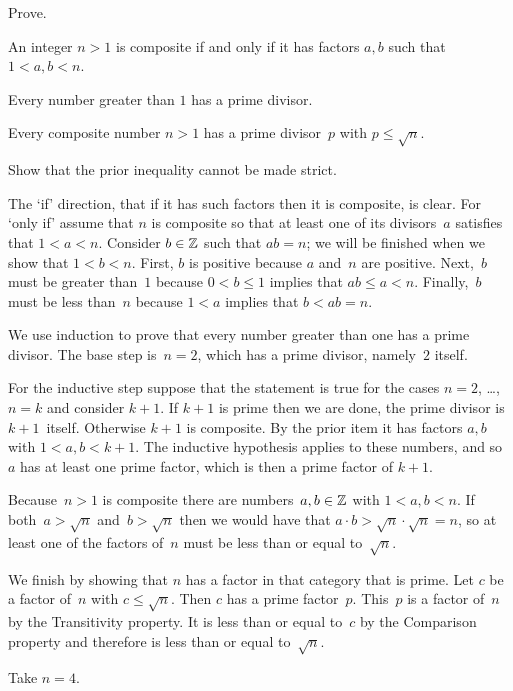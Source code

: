 \documentclass{ibl}  %
\begin{document}
\begin{ex} Prove.
\begin{exes}
\item An integer $n>1$ is composite if and only if it has factors $a,b$ 
  such that $1<a,b<n$.  
\item Every number greater than $1$ has a prime divisor.
\item Every composite number $n>1$ has a prime divisor~$p$ 
  with $p\leq \sqrt{n}$.
\item Show that the prior inequality cannot be made strict.     
\end{exes}
\begin{ans}
\begin{exes}
\item The `if' direction, that if it has such factors then it is composite,
  is clear.
  For `only if' assume that $n$ is composite so
  that at least one of its divisors~$a$ satisfies that $1<a<n$.
  Consider $b\in\mathbb{Z}$ such that $ab=n$; we will be finished when we show 
  that $1<b<n$.
  First, $b$ is positive because $a$ and~$n$ are positive.
  Next,~$b$ must be greater than~$1$ because $0<b\leq 1$ 
  implies that $ab\leq a<n$.
  Finally,~$b$ must be less than~$n$ because $1<a$ implies that $b<ab=n$. 
\item We use induction to prove that
  every number greater than one has a prime divisor.
  The base step is~$n=2$, which has a prime divisor, namely~$2$ itself.

  For the inductive step suppose that the statement is true for the cases 
  $n=2$, \ldots, $n=k$ and consider $k+1$.
  If $k+1$ is prime then we are done, the prime divisor is $k+1$~itself.
  Otherwise $k+1$ is composite.
  By the prior item it has factors $a,b$ with $1<a,b<k+1$.
  The inductive hypothesis applies to these numbers, and so~$a$ has at
  least one prime factor, which is then a prime factor of $k+1$.
\item Because~$n>1$ is composite there are numbers~$a,b\in\mathbb{Z}$ with
  $1<a,b<n$.
  If both~$a>\sqrt{n}$ and~$b>\sqrt{n}$ then we would have that
  $a\cdot b>\sqrt{n}\cdot\sqrt{n}=n$,
  so at least one of the factors of~$n$ must be less than or equal 
  to~$\sqrt{n}$.

  We finish by showing that $n$ has a factor in that category that is prime.
  Let $c$ be a factor of~$n$ with $c\leq\sqrt{n}$.
  Then $c$ has a prime factor~$p$.
  This~$p$ is a factor of~$n$ by the Transitivity property. 
  It is 
  less than or equal to~$c$ by the Comparison property and therefore
  is less than or equal to~$\sqrt{n}$.  
\item Take $n=4$.
\end{exes}
\end{ans}
\end{ex}
\end{document}
